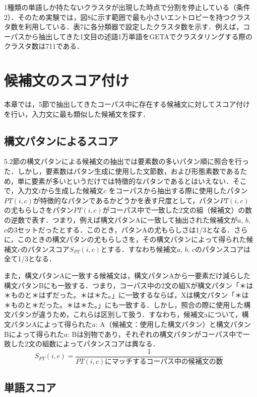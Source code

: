 \documentclass[japanese]{jnlp_1.4}
\begin{document}
1種類の単語しか持たないクラスタが出現した時点で分割を停止している（条件2）．そのため実験では，図8に示す範囲で最も小さいエントロピーを持つクラスタ数を利用している．表7に各分類器で設定したクラスタ数を示す．例えば，コーパスから抽出してきた1文目の述語1万単語をGETAでクラスタリングする際のクラスタ数は711である．


\section{候補文のスコア付け}

本章では，5節で抽出してきたコーパス中に存在する候補文に対してスコア付けを行い，入力文に最も類似した候補文を探す．

\subsection{構文パタンによるスコア}

5.2節の構文パタンによる候補文の抽出では要素数の多いパタン順に照合を行った．しかし，要素数はパタン生成に使用した文節数，および形態素数であるため，単に要素が多いというだけでは特徴的なパタンであるとはいえない．そこで，入力文$i$から生成した候補文$c$ をコーパスから抽出する際に使用したパタン $PT(i,c)$が特徴的なパタンであるかどうかを表す尺度として，パタン$PT(i,c)$の尤もらしさをパタン$PT(i,c)$がコーパス中で一致した2文の組（候補文）の数の逆数で表す．つまり，例えば構文パタンAに一致して抽出された候補文が$a$, $b$, $c$の3セットだったとする．このとき，パタンAの尤もらしさは1/3となる．さらに，このときの構文パタンの尤もらしさを，その構文パタンによって得られた候補文$c$のパタンスコア$S_{PT}(i,c)$とする．すなわち候補文$a$, $b$, $c$のパタンスコアは全て1/3となる．

また，構文パタンAに一致する候補文は，構文パタンAから一要素だけ減らした構文パタンBにも一致する．つまり，コーパス中の2文の組Xが構文パタン「＊は＊ものと＊はずだった。＊は＊た。」に一致するならば，Xは構文パタン「＊は＊ものと＊だった。＊は＊た。」にも一致する．しかし，照合の際に使用した構文パタンが違うため，これらは区別して扱う．すなわち，候補文aについて，構文パタンAによって得られた$a$: A（候補文：使用した構文パタン）と構文パタンBによって得られた$a$: Bは別物であり，それぞれの構文パタンがコーパス中で一致した2文の組数によってパタンスコアは異なる．
\begin{equation}
 S_{PT}(i,c) = \frac{1}{PT(i,c)にマッチするコーパス中の候補文の数}
\end{equation}


\subsection{単語スコア}
\end{document}
